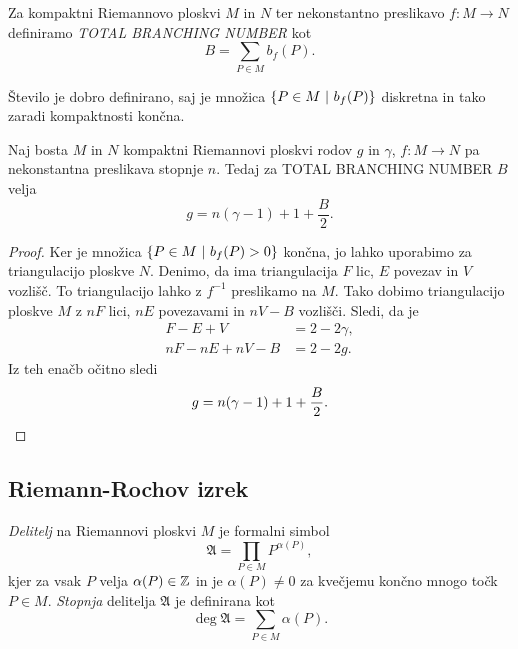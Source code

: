\begin{definicija}
Za kompaktni Riemannovo ploskvi $M$ in $N$ ter nekonstantno
preslikavo $f \colon M \to N$ definiramo
\emph{TOTAL BRANCHING NUMBER} kot
\[
B = \sum_{P \in M} b_f(P).
\]
\end{definicija}

Število je dobro definirano, saj je množica
$\left\{P \in M~\middle\vert~b_f(P)\right\}$ diskretna in tako zaradi kompaktnosti
končna.

\begin{izrek}
\label{iz:rie-hur}
Naj bosta $M$ in $N$ kompaktni Riemannovi ploskvi rodov $g$ in
$\gamma$, $f \colon M \to N$ pa nekonstantna preslikava stopnje
$n$. Tedaj za TOTAL BRANCHING NUMBER $B$ velja
\[
g = n(\gamma - 1) + 1 + \frac{B}{2}.
\]
\end{izrek}

\begin{proof}
Ker je množica $\left\{P \in M~\middle\vert~b_f(P) > 0\right\}$ končna, jo lahko
uporabimo za triangulacijo ploskve $N$. Denimo, da ima
triangulacija $F$ lic, $E$ povezav in $V$ vozlišč. To
triangulacijo lahko z $f^{-1}$ preslikamo na $M$. Tako dobimo
triangulacijo ploskve $M$ z $nF$ lici, $nE$ povezavami in $nV - B$
vozlišči. Sledi, da je
\begin{align*}
F - E + V &= 2 - 2 \gamma,
\\
nF - nE + nV - B &= 2 - 2g.
\end{align*}
Iz teh enačb očitno sledi
\[
g = n(\gamma - 1) + 1 + \frac{B}{2}. \qedhere
\]
\end{proof}


\subsection{Riemann-Rochov izrek}

\begin{definicija}
\emph{Delitelj} na Riemannovi ploskvi $M$ je formalni simbol
\[
\mathfrak{A} = \prod_{P \in M} P^{\alpha(P)},
\]
kjer za vsak $P$ velja $\alpha(P) \in \mathbb{Z}$ in je $\alpha(P) \ne 0$
za kvečjemu končno mnogo točk $P \in M$. \emph{Stopnja} delitelja
$\mathfrak{A}$ je definirana kot
\[
\deg \mathfrak{A} = \sum_{P \in M} \alpha(P).
\]
\end{definicija}

